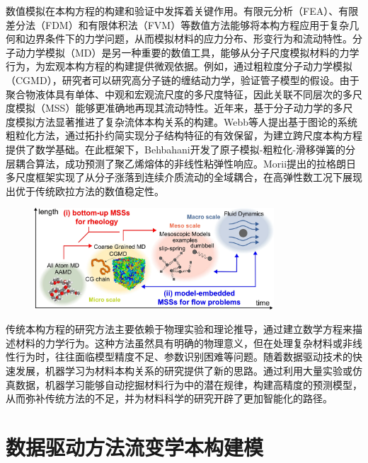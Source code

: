 数值模拟在本构方程的构建和验证中发挥着关键作用。有限元分析（FEA）、有限差分法（FDM）和有限体积法（FVM）等数值方法能够将本构方程应用于复杂几何和边界条件下的力学问题，从而模拟材料的应力分布、形变行为和流动特性\cite{alvesNumericalMethodsViscoelastic2021}。分子动力学模拟（MD）是另一种重要的数值工具，能够从分子尺度模拟材料的力学行为，为宏观本构方程的构建提供微观依据。例如，通过粗粒度分子动力学模拟（CGMD），研究者可以研究高分子链的缠结动力学，验证管子模型的假设\cite{li2023coupling,sgouros2017slip}。由于聚合物液体具有单体、中观和宏观流尺度的多尺度特征，因此关联不同层次的多尺度模拟（MSS）能够更准确地再现其流动特性\cite{satoRecentDevelopmentsMultiscale2024}。近年来，基于分子动力学的多尺度模拟方法显著推进了复杂流体本构关系的构建。Webb等人提出基于图论的系统粗粒化方法，通过拓扑约简实现分子结构特征的有效保留，为建立跨尺度本构方程提供了数学基础\cite{webb2018graph}。在此框架下，Behbahani开发了原子模拟-粗粒化-滑移弹簧的分层耦合算法，成功预测了聚乙烯熔体的非线性粘弹性响应\cite{behbahani2021dynamics}。Morii提出的拉格朗日多尺度框架实现了从分子涨落到连续介质流动的全域耦合，在高弹性数工况下展现出优于传统欧拉方法的数值稳定性\cite{morii2021lagrangian}。
\begin{figure}[htbp]
  \centering
  \includegraphics[width=0.8\textwidth]{Fig/duochidumoni.png}
\end{figure}

传统本构方程的研究方法主要依赖于物理实验和理论推导，通过建立数学方程来描述材料的力学行为。这种方法虽然具有明确的物理意义，但在处理复杂材料或非线性行为时，往往面临模型精度不足、参数识别困难等问题\cite{amamotoDatadrivenApproachesStructureproperty2022}。随着数据驱动技术的快速发展，机器学习为材料本构关系的研究提供了新的思路。通过利用大量实验或仿真数据，机器学习能够自动挖掘材料行为中的潜在规律，构建高精度的预测模型，从而弥补传统方法的不足，并为材料科学的研究开辟了更加智能化的路径。
\section{数据驱动方法流变学本构建模}
